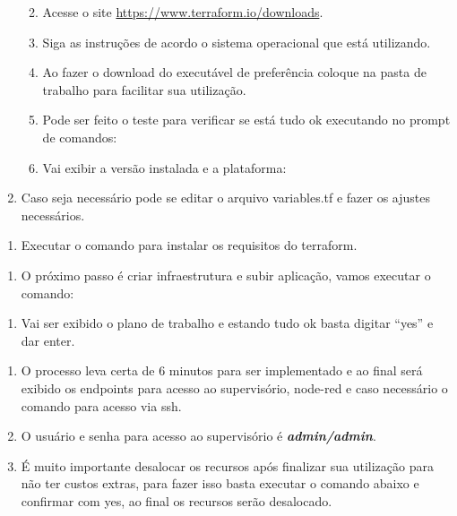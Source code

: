 \begin{enumerate}
  \begin{enumerate}
  \def\labelenumii{\arabic{enumii}.}
  \item
    Acesse o site \url{https://www.terraform.io/downloads}.
  \item
    Siga as instruções de acordo o sistema operacional que está
    utilizando.
  \item
    Ao fazer o download do executável de preferência coloque na pasta de
    trabalho para facilitar sua utilização.
  \item
    Pode ser feito o teste para verificar se está tudo ok executando no
    prompt de comandos:
  \item
    Vai exibir a versão instalada e a plataforma:
  \end{enumerate}
\item
  Caso seja necessário pode se editar o arquivo variables.tf e fazer os
  ajustes necessários.
\end{enumerate}

\begin{enumerate}
\def\labelenumi{\arabic{enumi}.}
\setcounter{enumi}{8}
\tightlist
\item
  Executar o comando para instalar os requisitos do terraform.
\end{enumerate}

\begin{enumerate}
\def\labelenumi{\arabic{enumi}.}
\setcounter{enumi}{9}
\tightlist
\item
  O próximo passo é criar infraestrutura e subir aplicação, vamos
  executar o comando:
\end{enumerate}

\begin{enumerate}
\def\labelenumi{\arabic{enumi}.}
\setcounter{enumi}{10}
\tightlist
\item
  Vai ser exibido o plano de trabalho e estando tudo ok basta digitar
  ``yes'' e dar enter.
\end{enumerate}

\begin{enumerate}
\def\labelenumi{\arabic{enumi}.}
\setcounter{enumi}{11}
\item
  O processo leva certa de 6 minutos para ser implementado e ao final
  será exibido os endpoints para acesso ao supervisório, node-red e caso
  necessário o comando para acesso via ssh.
\item
  O usuário e senha para acesso ao supervisório é
  \textbf{\emph{admin/admin}}.
\item
  É muito importante desalocar os recursos após finalizar sua utilização
  para não ter custos extras, para fazer isso basta executar o comando
  abaixo e confirmar com yes, ao final os recursos serão desalocado.
\end{enumerate}
